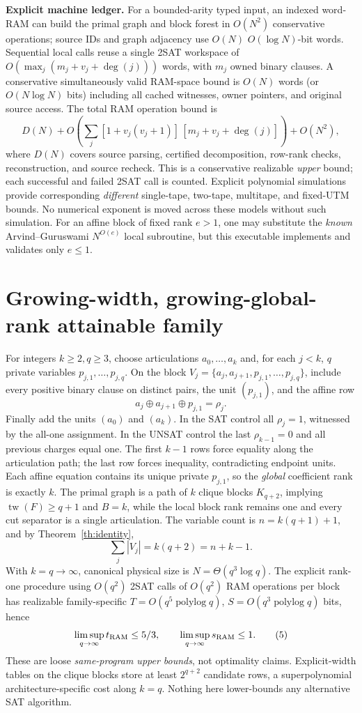 \documentclass[10pt]{article}
\begin{document}
\noindent\textbf{Explicit machine ledger.} For a bounded-arity typed input, an indexed word-RAM can build the primal graph and block forest in $O(N^2)$ conservative operations; source IDs and graph adjacency use $O(N)$ $O(\log N)$-bit words. Sequential local calls reuse a single 2SAT workspace of $O(\max_j(m_j+v_j+\deg(j)))$ words, with $m_j$ owned binary clauses. A conservative simultaneously valid RAM-space bound is $O(N)$ words (or $O(N\log N)$ bits) including all cached witnesses, owner pointers, and original source access. The total RAM operation bound is
\[
D(N)+O\!\left(\sum_j [1+v_j(v_j+1)]\,[m_j+v_j+\deg(j)]\right)+O(N^2),\tag{4}
\]
where $D(N)$ covers source parsing, certified decomposition, row-rank checks, reconstruction, and source recheck. This is a conservative realizable \emph{upper} bound; each successful and failed 2SAT call is counted. Explicit polynomial simulations provide corresponding \emph{different} single-tape, two-tape, multitape, and fixed-UTM bounds. No numerical exponent is moved across these models without such simulation. For an affine block of fixed rank $e>1$, one may substitute the \emph{known} Arvind--Guruswami $N^{O(e)}$ local subroutine, but this executable implements and validates only $e\le1$.

\section{Growing-width, growing-global-rank attainable family}
For integers $k\ge2,q\ge3$, choose articulations $a_0,\ldots,a_k$ and, for each $j<k$, $q$ private variables $p_{j,1},\ldots,p_{j,q}$. On the block $V_j=\{a_j,a_{j+1},p_{j,1},\ldots,p_{j,q}\}$, include every positive binary clause on distinct pairs, the unit $(p_{j,1})$, and the affine row
\[
 a_j\oplus a_{j+1}\oplus p_{j,1}=\rho_j.
\]
Finally add the units $(a_0)$ and $(a_k)$. In the SAT control all $\rho_j=1$, witnessed by the all-one assignment. In the UNSAT control the last $\rho_{k-1}=0$ and all previous charges equal one. The first $k-1$ rows force equality along the articulation path; the last row forces inequality, contradicting endpoint units. Each affine equation contains its unique private $p_{j,1}$, so the \emph{global} coefficient rank is exactly $k$. The primal graph is a path of $k$ clique blocks $K_{q+2}$, implying $\operatorname{tw}(F)\ge q+1$ and $B=k$, while the local block rank remains one and every cut separator is a single articulation. The variable count is $n=k(q+1)+1$, and by Theorem~\ref{th:identity},
\[
\sum_j |V_j|=k(q+2)=n+k-1.
\]
With $k=q\to\infty$, canonical physical size is $N=\Theta(q^3\log q)$. The explicit rank-one procedure using $O(q^2)$ 2SAT calls of $O(q^2)$ RAM operations per block has realizable family-specific $T=O(q^5\operatorname{polylog}q)$, $S=O(q^3\operatorname{polylog}q)$ bits, hence
\[
 \limsup_{q\to\infty}t_{\rm RAM}\le5/3,\qquad\limsup_{q\to\infty}s_{\rm RAM}\le1.
\tag{5}
\]
These are loose \emph{same-program upper bounds}, not optimality claims. Explicit-width tables on the clique blocks store at least $2^{q+2}$ candidate rows, a superpolynomial architecture-specific cost along $k=q$. Nothing here lower-bounds any alternative SAT algorithm.
\end{document}
